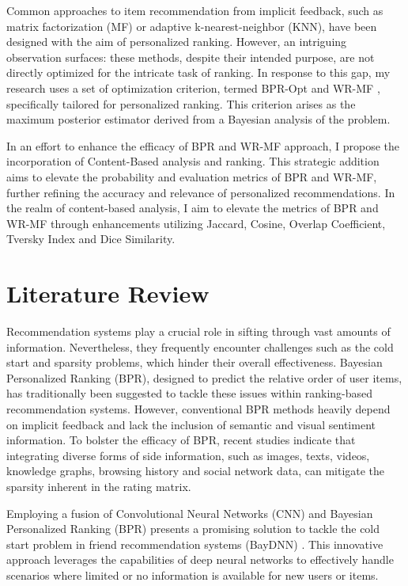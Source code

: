 \documentclass[journal]{IEEEtran}
\begin{document}
Common approaches to item recommendation from implicit feedback, such as matrix factorization (MF) or adaptive k-nearest-neighbor (KNN), 
have been designed with the aim of personalized ranking. However, an intriguing observation surfaces: these methods, despite their 
intended purpose, are not directly optimized for the intricate task of ranking. In response to this gap, my research uses a set of
optimization criterion, termed BPR-Opt \cite{rendle2012bpr} and WR-MF \cite{8252119}, specifically tailored for personalized ranking. 
This criterion arises as the maximum posterior estimator derived from a Bayesian analysis of the problem.

In an effort to enhance the efficacy of BPR and WR-MF approach, I propose the incorporation of Content-Based analysis and ranking. 
This strategic addition aims to elevate the probability and evaluation metrics of BPR and WR-MF, further refining the accuracy and 
relevance of personalized recommendations. In the realm of content-based analysis, I aim to elevate the metrics of BPR and WR-MF 
through enhancements utilizing Jaccard, Cosine, Overlap Coefficient, Tversky Index and Dice Similarity. 

\section{Literature Review}

Recommendation systems play a crucial role in sifting through vast amounts of information. Nevertheless, they frequently encounter 
challenges such as the cold start and sparsity problems, which hinder their overall effectiveness. Bayesian Personalized Ranking (BPR), 
designed to predict the relative order of user items, has traditionally been suggested to tackle these issues within ranking-based 
recommendation systems. However, conventional BPR methods heavily depend on implicit feedback and lack the inclusion of semantic 
and visual sentiment information. To bolster the efficacy of BPR, recent studies indicate that 
integrating diverse forms of side information, such as images, texts, videos, knowledge graphs, browsing history 
\cite{10.1145/3132847.3132941}\cite{8689028} and social network data, \cite{WU2024121930} can mitigate the sparsity inherent in the rating matrix. 

Employing a fusion of Convolutional Neural Networks (CNN) and Bayesian Personalized Ranking (BPR) presents a promising solution 
to tackle the cold start problem in friend recommendation systems (BayDNN) \cite{10.1145/3132847.3132941}. This innovative 
approach leverages the capabilities of deep neural networks to effectively handle scenarios where limited or no information is 
available for new users or items.
\end{document}
